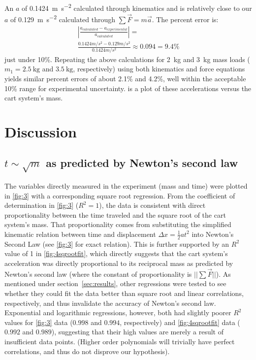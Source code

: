 \documentclass[reprint,amsmath,amssymb,aps]{revtex4-2}
\begin{document}
An $a$ of \qty{0.1424}{\meter\per\second\squared} calculated through kinematics and is relatively close to our $a$ of \qty{0.129}{\meter\per\second\squared} calculated through \(\sum\vec{F} = m\vec{a}\). The percent error is:
\begin{gather*}
    \left\lvert \frac{a_{calculated}-a_{experimental}}{a_{calculated}} \right\rvert = \tag{8}
    \\\frac{0.1424 m/s^2-0.129m/s^2}{0.1424 m/s^2} \approx 0.094 = 9.4\%
\end{gather*}
just under 10\%. Repeating the above calculations for \qty{2}{\kilo\gram} and \qty{3}{\kilo\gram} mass loads ($m_1=\qty{2.5}{\kilo\gram}$ and $\qty{3.5}{\kilo\gram}$, respectively) using both kinematics and force equations yields similar percent errors of about 2.1\% and 4.2\%, well within the acceptable 10\% range for experimental uncertainty.  is a plot of these accelerations versus the cart system's mass.






\section{Discussion}
\label{sec:discussion}

\subsection{$t \sim \sqrt{m}$ as predicted by Newton's second law}
The variables directly measured in the experiment (mass and time) were plotted in \cref{fig:3} with a corresponding square root regression. From the coefficient of determination in \cref{fig:3} ($R^2=1$), the data is consistent with direct proportionality between the time traveled and the square root of the cart system's mass. That proportionality comes from substituting the simplified kinematic relation between time and displacement $\Delta x=\frac{1}{2}at^2$ into Newton's Second Law (see \cref{fig:3} for exact relation). This is further supported by an $R^2$ value of 1 in \cref{fig:4sqrootfit}, which directly suggests that the cart system's acceleration was directly proportional to its reciprocal mass as predicted by Newton's second law (where the constant of proportionality is $||\sum\vec{F}||$). As mentioned under section~\ref{sec:results}, other regressions were tested to see whether they could fit the data better than square root and linear correlations, respectively, and thus invalidate the accuracy of Newton's second law. Exponential and logarithmic regressions, however, both had slightly poorer $R^2$ values for \cref{fig:3} data ($0.998$ and $0.994$, respectively) and \cref{fig:4sqrootfit} data ($0.992$ and $0.989$), suggesting that their high values are merely a result of insufficient data points. (Higher order polynomials will trivially have perfect correlations, and thus do not disprove our hypothesis).
\end{document}

